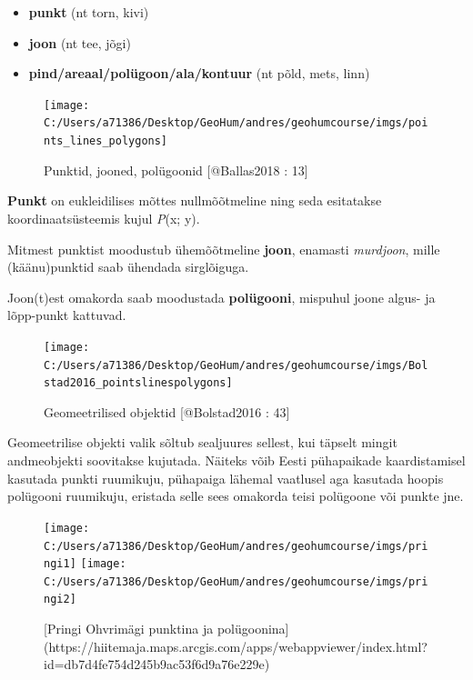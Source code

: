 \documentclass[
]{book}
\providecommand{\tightlist}{%
  \setlength{\itemsep}{0pt}\setlength{\parskip}{0pt}}
\begin{document}
\begin{itemize}
\tightlist
\item
  \textbf{punkt} (nt torn, kivi)\\
\item
  \textbf{joon} (nt tee, jõgi)\\
\item
  \textbf{pind/areaal/polügoon/ala/kontuur} (nt põld, mets, linn)
\end{itemize}

\begin{figure}

{\centering \texttt{[image: C:/Users/a71386/Desktop/GeoHum/andres/geohumcourse/imgs/points\_lines\_polygons]} 

}

\caption{Punktid, jooned, polügoonid [@Ballas2018 : 13]}\label{fig:ruumiobjektid}
\end{figure}

\textbf{Punkt} on eukleidilises mõttes nullmõõtmeline ning seda esitatakse koordinaatsüsteemis kujul \emph{P}(x; y).

Mitmest punktist moodustub ühemõõtmeline \textbf{joon}, enamasti \emph{murdjoon}, mille (käänu)punktid saab ühendada sirglõiguga.

Joon(t)est omakorda saab moodustada \textbf{polügooni}, mispuhul joone algus- ja lõpp-punkt kattuvad.

\begin{figure}

{\centering \texttt{[image: C:/Users/a71386/Desktop/GeoHum/andres/geohumcourse/imgs/Bolstad2016\_pointslinespolygons]} 

}

\caption{Geomeetrilised objektid [@Bolstad2016 : 43]}\label{fig:points-lines-polygons}
\end{figure}

Geomeetrilise objekti valik sõltub sealjuures sellest, kui täpselt mingit andmeobjekti soovitakse kujutada. Näiteks võib Eesti pühapaikade kaardistamisel kasutada punkti ruumikuju, pühapaiga lähemal vaatlusel aga kasutada hoopis polügooni ruumikuju, eristada selle sees omakorda teisi polügoone või punkte jne.

\begin{figure}

{\centering \texttt{[image: C:/Users/a71386/Desktop/GeoHum/andres/geohumcourse/imgs/pringi1]} \texttt{[image: C:/Users/a71386/Desktop/GeoHum/andres/geohumcourse/imgs/pringi2]} 

}

\caption{[Pringi Ohvrimägi punktina ja polügoonina](https://hiitemaja.maps.arcgis.com/apps/webappviewer/index.html?id=db7d4fe754d245b9ac53f6d9a76e229e)}\label{fig:pringi1}
\end{figure}
\end{document}
